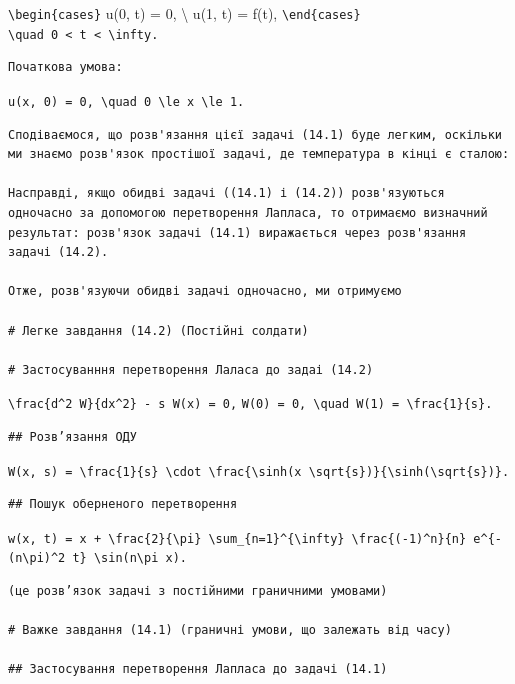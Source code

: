 \documentclass[
  ukrainian,
]{article}
\begin{document}
\texttt{\textbackslash{}begin\{cases\}} u(0, t) = 0, \textbackslash{}
u(1, t) = f(t), \texttt{\textbackslash{}end\{cases\}}
\texttt{\textbackslash{}quad\ 0\ \textless{}\ t\ \textless{}\ \textbackslash{}infty.}

\begin{verbatim}
Початкова умова:
\end{verbatim}

\texttt{u(x,\ 0)\ =\ 0,\ \textbackslash{}quad\ 0\ \textbackslash{}le\ x\ \textbackslash{}le\ 1.}

\begin{verbatim}
Сподіваємося, що розв'язання цієї задачі (14.1) буде легким, оскільки ми знаємо розв'язок простішої задачі, де температура в кінці є сталою:

Насправді, якщо обидві задачі ((14.1) і (14.2)) розв'язуються одночасно за допомогою перетворення Лапласа, то отримаємо визначний результат: розв'язок задачі (14.1) виражається через розв'язання задачі (14.2).

Отже, розв'язуючи обидві задачі одночасно, ми отримуємо

# Легке завдання (14.2) (Постійні солдати)

# Застосуванння перетворення Лаласа до задаі (14.2)
\end{verbatim}

\texttt{\textbackslash{}frac\{d\^{}2\ W\}\{dx\^{}2\}\ -\ s\ W(x)\ =\ 0,}
\texttt{W(0)\ =\ 0,\ \textbackslash{}quad\ W(1)\ =\ \textbackslash{}frac\{1\}\{s\}.}

\begin{verbatim}
## Розв’язання ОДУ
\end{verbatim}

\texttt{W(x,\ s)\ =\ \textbackslash{}frac\{1\}\{s\}\ \textbackslash{}cdot\ \textbackslash{}frac\{\textbackslash{}sinh(x\ \textbackslash{}sqrt\{s\})\}\{\textbackslash{}sinh(\textbackslash{}sqrt\{s\})\}.}

\begin{verbatim}
## Пошук оберненого перетворення
\end{verbatim}

\texttt{w(x,\ t)\ =\ x\ +\ \textbackslash{}frac\{2\}\{\textbackslash{}pi\}\ \textbackslash{}sum\_\{n=1\}\^{}\{\textbackslash{}infty\}\ \textbackslash{}frac\{(-1)\^{}n\}\{n\}\ e\^{}\{-(n\textbackslash{}pi)\^{}2\ t\}\ \textbackslash{}sin(n\textbackslash{}pi\ x).}

\begin{verbatim}
(це розв’язок задачі з постійними граничними умовами)

# Важке завдання (14.1) (граничні умови, що залежать від часу)

## Застосування перетворення Лапласа до задачі (14.1)
\end{verbatim}
\end{document}
